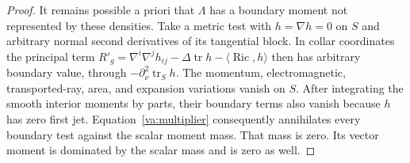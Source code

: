 \begin{proof}
It remains possible a priori that \(\Lambda\) has a boundary moment
not represented by these densities.  Take a metric test with
\(h=\nabla h=0\) on \(S\) and arbitrary normal second derivatives of
its tangential block.  In collar coordinates the principal term
\(R'_g=\nabla^i\nabla^jh_{ij}-\Delta\operatorname{tr}h-\langle
\operatorname{Ric},h\rangle\) then has arbitrary boundary value,
through \(-\partial_\nu^2\operatorname{tr}_S h\).  The momentum,
electromagnetic, transported-ray, area, and expansion variations vanish
on \(S\).  After integrating the smooth interior moments by parts,
their boundary terms also vanish because \(h\) has zero first jet.
Equation~\eqref{va:multiplier} consequently annihilates every boundary
test against the scalar moment mass.  That mass is zero.  Its vector
moment is dominated by the scalar mass and is zero as well.
\end{proof}

